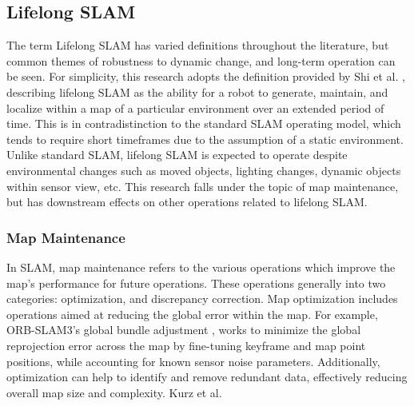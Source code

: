 \subsection{Lifelong SLAM}

The term Lifelong SLAM has varied definitions throughout the literature, but common themes of robustness to dynamic change, and long-term operation can be seen. For simplicity, this research adopts the definition provided by Shi et al. \cite{shiAreWeReady2020}, describing lifelong SLAM as the ability for a robot to generate, maintain, and localize within a map of a particular environment over an extended period of time. This is in contradistinction to the standard SLAM operating model, which tends to require short timeframes due to the assumption of a static environment. Unlike standard SLAM, lifelong SLAM is expected to operate despite environmental changes such as moved objects, lighting changes, dynamic objects within sensor view, etc. This research falls under the topic of map maintenance, but has downstream effects on other operations related to lifelong SLAM.

\subsubsection{Map Maintenance}

In SLAM, map maintenance refers to the various operations which improve the map's performance for future operations. These operations generally into two categories: optimization, and discrepancy correction. Map optimization includes operations aimed at reducing the global error within the map. For example, ORB-SLAM3's global bundle adjustment \cite{camposORBSLAM3AccurateOpenSource2021}, works to minimize the global reprojection error across the map by fine-tuning keyframe and map point positions, while accounting for known sensor noise parameters. Additionally, optimization can help to identify and remove redundant data, effectively reducing overall map size and complexity. Kurz et al. 